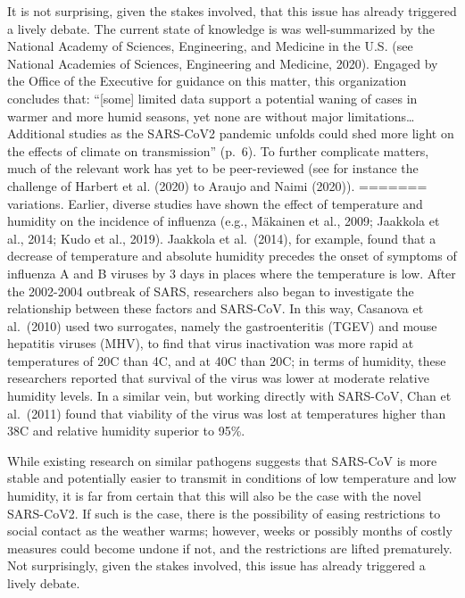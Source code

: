 \documentclass[]{elsarticle} %
\begin{document}
It is not surprising, given the stakes involved, that this issue has
already triggered a lively debate. The current state of knowledge is was
well-summarized by the National Academy of Sciences, Engineering, and
Medicine in the U.S. (see National Academies of Sciences, Engineering
and Medicine, 2020). Engaged by the Office of the Executive for guidance
on this matter, this organization concludes that: ``{[}some{]} limited
data support a potential waning of cases in warmer and more humid
seasons, yet none are without major limitations\ldots Additional studies
as the SARS-CoV2 pandemic unfolds could shed more light on the effects
of climate on transmission'' (p.~6). To further complicate matters, much
of the relevant work has yet to be peer-reviewed (see for instance the
challenge of Harbert et al. (2020) to Araujo and Naimi (2020)).
=======
variations. Earlier, diverse studies have shown the effect of
temperature and humidity on the incidence of influenza (e.g., Mäkainen
et al., 2009; Jaakkola et al., 2014; Kudo et al., 2019). Jaakkola et
al.~(2014), for example, found that a decrease of temperature and
absolute humidity precedes the onset of symptoms of influenza A and B
viruses by 3 days in places where the temperature is low. After the
2002-2004 outbreak of SARS, researchers also began to investigate the
relationship between these factors and SARS-CoV. In this way, Casanova
et al.~(2010) used two surrogates, namely the gastroenteritis (TGEV) and
mouse hepatitis viruses (MHV), to find that virus inactivation was more
rapid at temperatures of 20C than 4C, and at 40C than 20C; in terms of
humidity, these researchers reported that survival of the virus was
lower at moderate relative humidity levels. In a similar vein, but
working directly with SARS-CoV, Chan et al.~(2011) found that viability
of the virus was lost at temperatures higher than 38C and relative
humidity superior to 95\%.

While existing research on similar pathogens suggests that SARS-CoV is
more stable and potentially easier to transmit in conditions of low
temperature and low humidity, it is far from certain that this will also
be the case with the novel SARS-CoV2. If such is the case, there is the
possibility of easing restrictions to social contact as the weather
warms; however, weeks or possibly months of costly measures could become
undone if not, and the restrictions are lifted prematurely. Not
surprisingly, given the stakes involved, this issue has already
triggered a lively debate.
\end{document}
